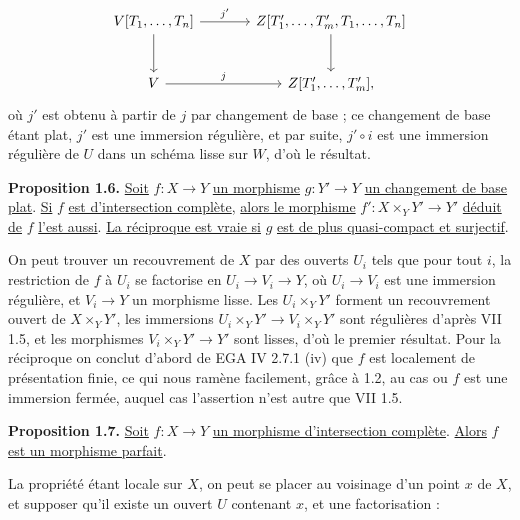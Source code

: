 
\[
\begin{tikzcd}[column sep=large,row sep=large]
V[T_1,\ldots,T_n] \arrow[r,"j'"] \arrow[d] & Z[T'_1,\ldots,T'_m,T_1,\ldots,T_n] \arrow[d]\\
V \arrow[r,"j"] & Z[T'_1,\ldots,T'_m],
\end{tikzcd}
\]
où $j'$ est obtenu à partir de $j$ par changement de base ; ce changement de base étant plat, $j'$ est une immersion régulière, et par suite, $j'\circ i$ est une immersion régulière de $U$ dans un schéma lisse sur $W$, d'où le résultat.

\textbf{Proposition 1.6.} \uline{Soit} $f:X\to Y$ \uline{un morphisme} $g:Y'\to Y$ \uline{un changement de base plat}. \uline{Si} $f$ \uline{est d'intersection complète}, \uline{alors le morphisme} $f':X\times_Y Y'\to Y'$ \uline{déduit de} $f$ \uline{l'est aussi}. \uline{La réciproque est vraie si} $g$ \uline{est de plus quasi-compact et surjectif}.

On peut trouver un recouvrement de $X$ par des ouverts $U_i$ tels que pour tout $i$, la restriction de $f$ à $U_i$ se factorise en $U_i\longrightarrow V_i\longrightarrow Y$, où $U_i\to V_i$ est une immersion régulière, et $V_i\to Y$ un morphisme lisse. Les $U_i\times_Y Y'$ forment un recouvrement ouvert de $X\times_Y Y'$, les immersions $U_i\times_Y Y'\longrightarrow V_i\times_Y Y'$ sont régulières d'après VII 1.5, et les morphismes $V_i\times_Y Y'\to Y'$ sont lisses, d'où le premier résultat. Pour la réciproque on conclut d'abord de EGA IV 2.7.1 (iv) que $f$ est localement de présentation finie, ce qui nous ramène facilement, grâce à 1.2, au cas ou $f$ est une immersion fermée, auquel cas l'assertion n'est autre que VII 1.5.

\textbf{Proposition 1.7.} \uline{Soit} $f:X\to Y$ \uline{un morphisme d'intersection complète}. \uline{Alors} $f$ \uline{est un morphisme parfait}.

La propriété étant locale sur $X$, on peut se placer au voisinage d'un point $x$ de $X$, et supposer qu'il existe un ouvert $U$ contenant $x$, et une factorisation :

